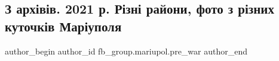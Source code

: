  
 
 
 
 

\subsection{З архівів. 2021 р. Різні райони, фото з різних куточків Маріуполя}
\label{sec:15_02_2023.fb.fb_group.mariupol.pre_war.5.z_arkh_v_v__2021_r__}

\ifcmt
 author_begin
   author_id fb_group.mariupol.pre_war
 author_end
\fi
